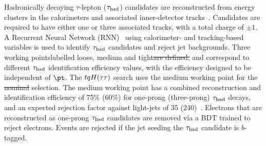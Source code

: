 \documentclass[PAPER, coverpage, atlasdraft=true, texlive=2016, UKenglish]{\ATLASLATEXPATH atlasdoc}
\providecommand{\DIFadd}[1]{{\protect\color{blue}\uwave{#1}}} %
\providecommand{\DIFdel}[1]{{\protect\color{red}\sout{#1}}}                      %
\providecommand{\DIFaddbegin}{} %
\providecommand{\DIFaddend}{} %
\providecommand{\DIFdelbegin}{} %
\providecommand{\DIFdelend}{} %
\begin{document}
Hadronically decaying $\tau$-lepton ($\had$) candidates are reconstructed from energy clusters in the calorimeters and
associated inner-detector tracks~\cite{ATL-PHYS-PUB-2019-033}. %
Candidates are required to have either one or three associated tracks,
with a total charge of $\pm 1$.
A Recurrent Neural Network (RNN)~\cite{Graves:2012SCI}
using calorimeter- and tracking-based variables is used to identify $\had$ candidates and reject jet backgrounds.
Three working points\DIFaddbegin \DIFadd{, }\DIFaddend labelled loose, medium and tight\DIFdelbegin \DIFdel{are defined, }\DIFdelend \DIFaddbegin \DIFadd{, are defined }\DIFaddend and correspond to different $\had$ identification efficiency values, with the efficiency designed to be independent of $\pt$. The $tqH(\tau\tau)$ search uses the medium
working point for the \DIFdelbegin \DIFdel{nominal }\DIFdelend \DIFaddbegin \DIFadd{$\had$ }\DIFaddend selection.
The medium working point has a combined reconstruction and identification efficiency of 75\% (60\%) for one-prong (three-prong) $\had$ 
decays, and an expected rejection factor against light-jets of 35 (240)~\cite{ATL-PHYS-PUB-2019-033}. 
Electrons that are reconstructed as one-prong $\had$ candidates are removed via a BDT trained to reject electrons.
Events are rejected if the jet seeding the $\had$ candidate is $b$-tagged.
\end{document}
